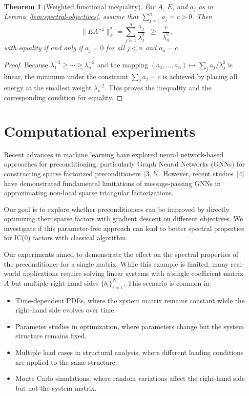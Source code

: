 \documentclass[conference]{IEEEtran}
\newtheorem{theorem}{Theorem}[section]
\begin{document}
\begin{theorem}[Weighted functional inequality]
For $A$, $E$, and $a_j$ as in Lemma~\ref{lem:spectral-objectives}, assume that 
$\sum_{j=1}^n a_j = c > 0$. Then
\begin{equation*}
\|E A^{-1}\|_F^2 = \sum_{j=1}^n \frac{a_j}{\lambda_j^2} \;\;\ge\;\; \frac{c}{\lambda_n^2},
\end{equation*}
with equality if and only if $a_j = 0$ for all $j < n$ and $a_n = c$.
\end{theorem}

\begin{proof}
Because $\lambda_1^{-2} \ge \cdots \ge \lambda_n^{-2}$ and the mapping 
$(a_1,\dots,a_n) \mapsto \sum_j a_j/\lambda_j^2$ is linear, 
the minimum under the constraint $\sum_j a_j = c$ is achieved by placing all energy 
at the smallest weight $\lambda_n^{-2}$. This proves the inequality and the 
corresponding condition for equality.
\end{proof}


\section{Computational experiments}

Recent advances in machine learning have explored neural network-based approaches for preconditioning, particularly Graph Neural Networks (GNNs) for constructing sparse factorized preconditioners~[3, 5]. However, recent studies~[4] have demonstrated fundamental limitations of message-passing GNNs in approximating non-local sparse triangular factorizations.

Our goal is to explore whether preconditioners can be improved by directly optimizing their sparse factors with gradient descent on different objectives. We investigate if this parameter-free approach can lead to better spectral properties for IC(0) factors with classical algorithm.

Our experiments aimed to demonstrate the effect on the spectral properties of the preconditioner for a single matrix. While this example is limited, many real-world applications require solving linear systems with a single coefficient matrix $A$ but multiple right-hand sides $\{ b_i\}_{i=1}^N$. This scenario is common in:

\begin{itemize}
\item Time-dependent PDEs, where the system matrix remains constant while the right-hand side evolves over time.
\item Parameter studies in optimization, where parameters change but the system structure remains fixed.
\item Multiple load cases in structural analysis, where different loading conditions are applied to the same structure.
\item Monte Carlo simulations, where random variations affect the right-hand side but not the system matrix.
\end{itemize}
\end{document}
